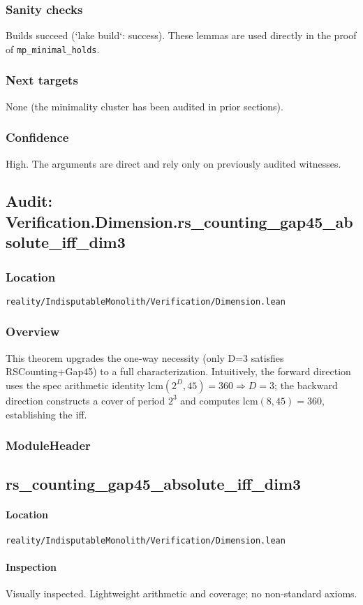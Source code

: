 \documentclass{article}
\newcommand{\FileRef}[1]{\texttt{#1}}
\newcommand{\ModuleHeader}[3]{%
  \subsection{#1}
  \paragraph{Location} \FileRef{#2}\\
  \paragraph{Inspection} #3
}
\begin{document}
\subsubsection{Sanity checks}
Builds succeed (`lake build`: success). These lemmas are used directly in the proof of \texttt{mp\_minimal\_holds}.

\subsubsection{Next targets}
None (the minimality cluster has been audited in prior sections).

\subsubsection{Confidence}
High. The arguments are direct and rely only on previously audited witnesses.


\subsection{Audit: Verification.Dimension.rs\_counting\_gap45\_absolute\_iff\_dim3}
\subsubsection{Location}
\FileRef{reality/IndisputableMonolith/Verification/Dimension.lean}

\subsubsection{Overview}
This theorem upgrades the one‑way necessity (only D=3 satisfies RSCounting+Gap45) to a full characterization. Intuitively, the forward direction uses the spec arithmetic identity \(\mathrm{lcm}(2^D,45)=360 \Rightarrow D=3\); the backward direction constructs a cover of period \(2^3\) and computes \(\mathrm{lcm}(8,45)=360\), establishing the iff.

\subsubsection{ModuleHeader}
\ModuleHeader{rs\_counting\_gap45\_absolute\_iff\_dim3}{reality/IndisputableMonolith/Verification/Dimension.lean}{Visually inspected. Lightweight arithmetic and coverage; no non‑standard axioms.}
\end{document}

